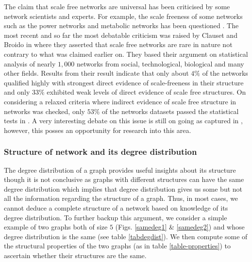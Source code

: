 \documentclass[10pt,a4paper]{article}
\theoremstyle{plain}
\theoremstyle{definition}
\begin{document}
The claim that scale free networks are universal has been criticised by some network scientists and experts. For example, the scale freeness of some networks such as the power networks and metabolic networks has been questioned \citep{tanaka2005scale,amaral2000classes}. The most recent and so far the most debatable criticism was raised by Clauset and Broido in \citep{broido2018scale} where they asserted that scale free networks are rare in nature not contrary to what was claimed earlier on. They based their argument on statistical analysis of nearly $1,000$ networks from social, technological, biological and many other fields. Results from their result indicate that only about $4\%$ of the networks qualified highly with strongest direct evidence of scale-freeness in their structure and only $33\%$ exhibited weak levels of direct evidence of scale free structures. On considering a relaxed criteria where indirect evidence of scale free structure in networks was checked, only $53\%$ of the networks datasets passed the statistical tests in \citep{broido2018scale}. A very interesting debate on this issue is still on going as captured in \citep{Quantamagazine}, however, this posses an opportunity for research into this area.



\subsubsection{Structure of network and its degree distribution}
The degree distribution of a graph provides useful insights about its structure though it is not conclusive as 
graphs with different structures can have the same degree distribution which implies that degree distribution gives us some but not all the information regarding the structure
of a graph. Thus, in most cases, we cannot deduce a complete structure of a network based on knowledge of
its degree distribution. To further backup this argument, we consider a simple example of two graphs both of size $5$ (Figs. \ref{samedeg1} \& \ref{samedeg2}) and whose degree distribution is the same (see table \ref{tabdegdist}). We then compute some of the structural properties of the two graphs (as in table \ref{table-properties}) to ascertain whether their structures are the same.
\end{document}
